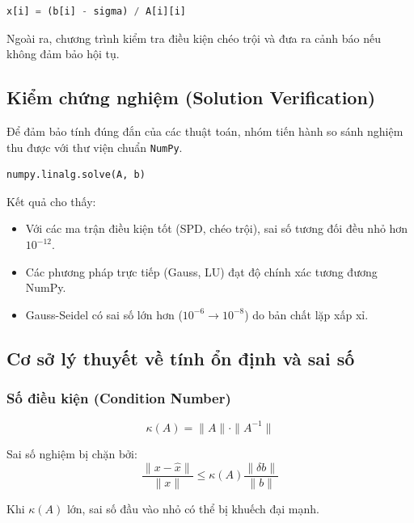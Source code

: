 \documentclass[a4paper]{article}
\begin{document}
\begin{lstlisting}[language=Python, style=pythonstyle, caption={Cập nhật nghiệm Gauss-Seidel}]
x[i] = (b[i] - sigma) / A[i][i]
\end{lstlisting}

Ngoài ra, chương trình kiểm tra điều kiện chéo trội và đưa ra cảnh báo nếu không đảm bảo hội tụ.

\subsection{Kiểm chứng nghiệm (Solution Verification)}

Để đảm bảo tính đúng đắn của các thuật toán, nhóm tiến hành so sánh nghiệm thu được với thư viện chuẩn \texttt{NumPy}.


\begin{lstlisting}[language=Python, style=pythonstyle]
numpy.linalg.solve(A, b)
\end{lstlisting}

Kết quả cho thấy:
\begin{itemize}
    \item Với các ma trận điều kiện tốt (SPD, chéo trội), sai số tương đối đều nhỏ hơn $10^{-12}$.
    \item Các phương pháp trực tiếp (Gauss, LU) đạt độ chính xác tương đương NumPy.
    \item Gauss-Seidel có sai số lớn hơn ($10^{-6} \rightarrow 10^{-8}$) do bản chất lặp xấp xỉ.
\end{itemize}

\subsection{Cơ sở lý thuyết về tính ổn định và sai số}

\subsubsection{Số điều kiện (Condition Number)}
\begin{equation}
    \kappa(A) = \|A\| \cdot \|A^{-1}\|
\end{equation}

Sai số nghiệm bị chặn bởi:
\begin{equation}
    \frac{\|x - \hat{x}\|}{\|x\|} \le \kappa(A)\frac{\|\delta b\|}{\|b\|}
\end{equation}

Khi $\kappa(A)$ lớn, sai số đầu vào nhỏ có thể bị khuếch đại mạnh.
\end{document}
